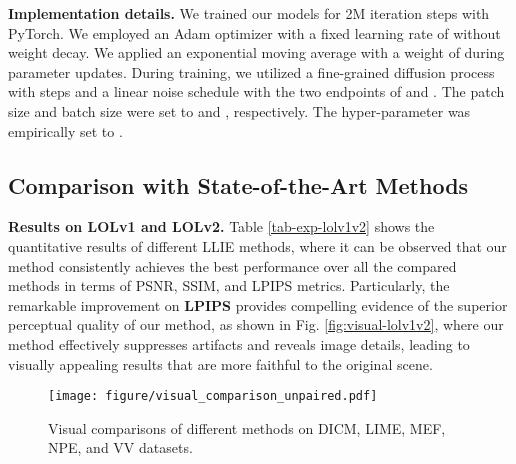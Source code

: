 \documentclass{article}
\begin{document}
\textbf{Implementation details.}
We trained our models for 2M iteration steps with PyTorch.
We employed an Adam optimizer \cite{kingma2014adam} with a fixed learning rate of  without weight decay. We applied an exponential moving average with a weight of  during parameter updates. During training, we utilized a fine-grained diffusion process with  steps and a linear noise schedule with the two endpoints of  and . The patch size and batch size were set to  and , respectively. The hyper-parameter  was empirically set to .

\subsection{Comparison with State-of-the-Art Methods}

\textbf{Results on LOLv1 and LOLv2.}
Table \ref{tab-exp-lolv1v2} shows the quantitative results of different LLIE methods, where it can be observed that our method consistently achieves the best performance over all the compared methods in terms of PSNR, SSIM, and LPIPS metrics. Particularly, the remarkable improvement on \textbf{LPIPS} provides compelling evidence of the superior perceptual quality of our method, as shown in Fig. \ref{fig:visual-lolv1v2}, where our method effectively suppresses artifacts and reveals image details, leading to visually appealing results that are more faithful to the original scene.

\begin{figure}[!t]
\centering
\texttt{[image: figure/visual\_comparison\_unpaired.pdf]}
\vspace{-0.3cm}
\caption{Visual comparisons of different methods on DICM, LIME, MEF, NPE, and VV datasets.}
\label{fig:visual-unpaired}
\end{figure}
\end{document}
